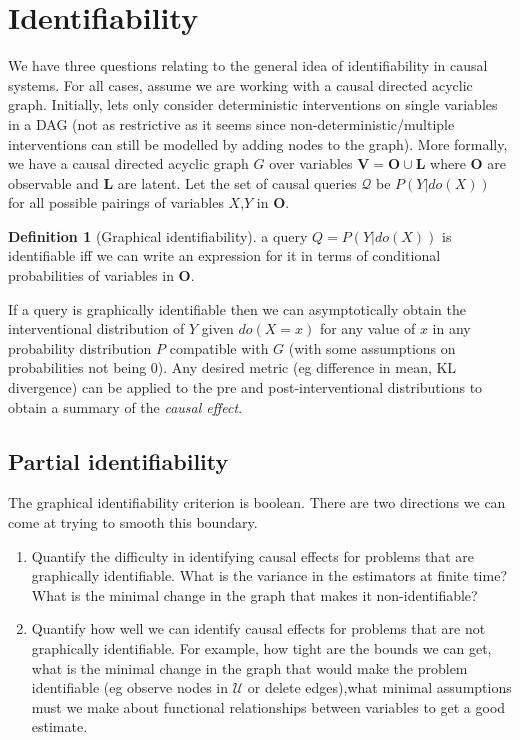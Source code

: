 \documentclass{article}
\newcommand{\latent}{\mathbf{L}}
\newcommand{\observed}{\mathbf{O}}
\newcommand{\variables}{\mathbf{V}}
\theoremstyle{plain}
\theoremstyle{definition}
\newtheorem{definition}[theorem]{Definition}
\begin{document}
 


\section*{Identifiability}

We have three questions relating to the general idea of identifiability in causal systems. For all cases, assume we are working with a causal directed acyclic graph. Initially, lets only consider deterministic interventions on single variables in a DAG (not as restrictive as it seems since non-deterministic/multiple interventions can still be modelled by adding nodes to the graph). More formally, we have a causal directed acyclic graph $G$ over variables $\variables = \observed \cup \latent$ where $\observed$ are observable and $\latent$ are latent. Let the set of causal queries $\mathcal{Q}$ be $P(Y|do(X))$ for all possible pairings of variables $X$,$Y$ in $\observed$.

\begin{definition}[Graphical identifiability] a query $Q = P(Y|do(X))$ is identifiable iff we can write an expression for it in terms of conditional probabilities of variables in $\observed$. 
\end{definition}

If a query is graphically identifiable then we can asymptotically obtain the interventional distribution of $Y$ given $do(X=x)$ for any value of $x$ in any probability distribution $P$ compatible with $G$ (with some assumptions on probabilities not being 0). Any desired metric (eg difference in mean, KL divergence) can be applied to the pre and post-interventional distributions to obtain a summary of the \textit{causal effect}. 

\subsection*{Partial identifiability}

The graphical identifiability criterion is boolean. There are two directions we can come at trying to smooth this boundary.

\begin{enumerate}
\item Quantify the difficulty in identifying causal effects for problems that are graphically identifiable. What is the variance in the estimators at finite time? What is the minimal change in the graph that makes it non-identifiable? 

\item Quantify how well we can identify causal effects for problems that are not graphically identifiable. For example, how tight are the bounds we can get, what is the minimal change in the graph that would make the problem identifiable (eg observe nodes in $\mathcal{U}$ or delete edges),what minimal assumptions must we make about functional relationships between variables to get a good estimate. 
\end{enumerate}
\end{document}
